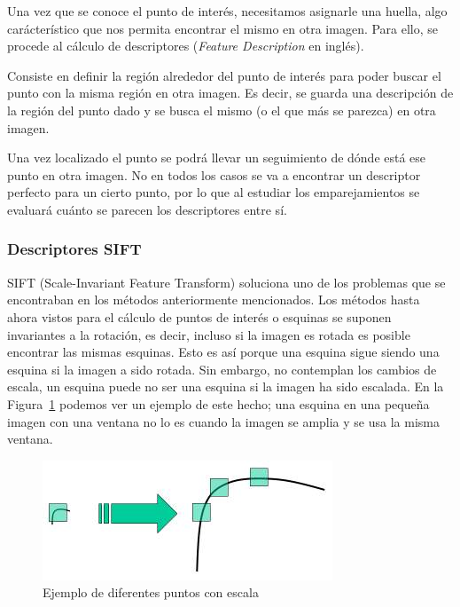 Una vez que se conoce el punto de interés, necesitamos asignarle una huella, algo carácterístico que nos permita encontrar el mismo en otra imagen. Para ello, se procede al cálculo de descriptores (\textit{Feature Description} en inglés).

Consiste en definir la región alrededor del punto de interés para poder buscar el punto con la misma región en otra imagen. Es decir, se guarda una descripción de la región del punto dado y se busca el mismo (o el que más se parezca) en otra imagen.

Una vez localizado el punto se podrá llevar un seguimiento de dónde está ese punto en otra imagen. No en todos los casos se va a encontrar un descriptor perfecto para un cierto punto, por lo que al estudiar los emparejamientos se evaluará cuánto se parecen los descriptores entre sí.

\subsubsection{Descriptores SIFT}

SIFT (Scale-Invariant Feature Transform) soluciona uno de los problemas que se encontraban en los métodos anteriormente mencionados. Los métodos hasta ahora vistos para el cálculo de puntos de interés o esquinas se suponen invariantes a la rotación, es decir, incluso si la imagen es rotada es posible encontrar las mismas esquinas. Esto es así porque una esquina sigue siendo una esquina si la imagen a sido rotada. Sin embargo, no contemplan los cambios de escala, un esquina puede no ser una esquina si la imagen ha sido escalada. En la Figura~\ref{fig:sift_scale_invariant} podemos ver un ejemplo de este hecho; una esquina en una pequeña imagen con una ventana no lo es cuando la imagen se amplia y se usa la misma ventana.

\begin{figure}[ht]
\centering
\includegraphics[scale=0.8]{Figures/sift_scale_invariant.jpg}
\decoRule
\caption[Ejemplo de sistema escalarmente variante]{Ejemplo de diferentes puntos con escala}
\label{fig:sift_scale_invariant}
\end{figure}

